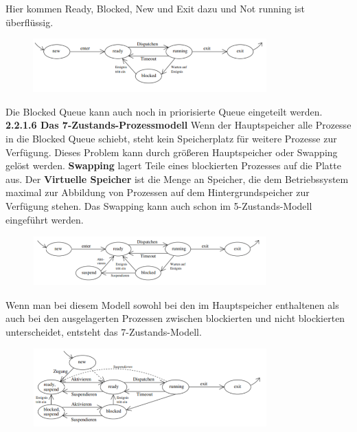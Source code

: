 \documentclass{article}
\begin{document}
    Hier kommen Ready, Blocked, New und Exit dazu und Not running ist überflüssig.
    \begin{figure}[h]
        \centering
	    \includegraphics[width=90mm]{Skizzen/2. Kapitel/5-Zustandsmodell.png}
    \end{figure}
    Die Blocked Queue kann auch noch in priorisierte Queue eingeteilt werden.\newline
    \\
    \textbf{2.2.1.6 Das 7-Zustands-Prozessmodell}\newline
    Wenn der Hauptspeicher alle Prozesse in die Blocked Queue schiebt, steht kein Speicherplatz für weitere Prozesse zur Verfügung. Dieses Problem kann durch größeren Hauptspeicher oder Swapping gelöst werden.\newline
    \textbf{Swapping} lagert Teile eines blockierten Prozesses auf die Platte aus.\newline
    Der \textbf{Virtuelle Speicher} ist die Menge an Speicher, die dem Betriebssystem maximal zur Abbildung von Prozessen auf dem Hintergrundspeicher zur Verfügung stehen.\newline
    Das Swapping kann auch schon im 5-Zustands-Modell eingeführt werden.
    \begin{figure}[h]
        \centering
	    \includegraphics[width=90mm]{Skizzen/2. Kapitel/5-Zustandsmodell-mit-Suspend.png}
    \end{figure}
    Wenn man bei diesem Modell sowohl bei den im Hauptspeicher enthaltenen als auch bei den ausgelagerten Prozessen zwischen blockierten und nicht blockierten unterscheidet, entsteht das 7-Zustands-Modell.
    \begin{figure}[h]
        \centering
	    \includegraphics[width=90mm]{Skizzen/2. Kapitel/7-Zustandsmodell.png}
    \end{figure}
\end{document}
